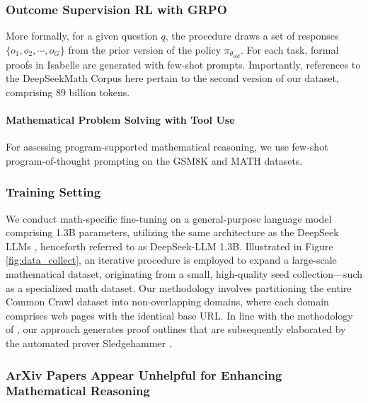 \begin{itemize}[topsep=0pt]
\begin{itemize}[topsep=0pt]
\begin{itemize}[topsep=0pt]
\subsubsection{Outcome Supervision RL with GRPO} More formally, for a given question $q$, the procedure draws a set of responses $\{o_1, o_2, \cdots, o_G\}$ from the prior version of the policy $\pi_{\theta_{old}}$. For each task, formal proofs in Isabelle are generated with few-shot prompts. Importantly, references to the DeepSeekMath Corpus here pertain to the second version of our dataset, comprising 89 billion tokens. \paragraph{Mathematical Problem Solving with Tool Use} For assessing program-supported mathematical reasoning, we use few-shot program-of-thought prompting \citep{pot,pal} on the GSM8K and MATH datasets. \end{itemize}

\subsubsection{Training Setting}
\label{sec:quality-policy}
We conduct math-specific fine-tuning on a general-purpose language model comprising 1.3B parameters, utilizing the same architecture as the DeepSeek LLMs \citep{deepseek-llm}, henceforth referred to as DeepSeek-LLM 1.3B. Illustrated in Figure \ref{fig:data_collect}, an iterative procedure is employed to expand a large-scale mathematical dataset, originating from a small, high-quality seed collection—such as a specialized math dataset. Our methodology involves partitioning the entire Common Crawl dataset into non-overlapping domains, where each domain comprises web pages with the identical base URL. In line with the methodology of \cite{dsp_proof}, our approach generates proof outlines that are subsequently elaborated by the automated prover Sledgehammer \citep{sledgehammer}. \subsubsection{ArXiv Papers Appear Unhelpful for Enhancing Mathematical Reasoning}


\end{itemize}
\end{itemize}
